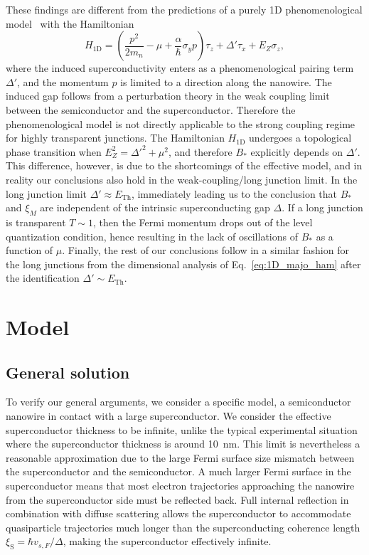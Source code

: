 These findings are different from the predictions of a purely 1D phenomenological model~\cite{Lutchyn2010, Oreg2010} with the Hamiltonian
\begin{equation}
\label{eq:1D_majo_ham}
H_\textrm{1D} = \left(\frac{p^2}{2m_n} -\mu +\frac{\alpha}{\hbar} \sigma_y p\right)\tau_z + \Delta' \tau_x + E_Z \sigma_z,
\end{equation}
where the induced superconductivity enters as a phenomenological pairing term $\Delta'$, and the momentum $p$ is limited to a direction along the nanowire.
The induced gap follows from a perturbation theory in the weak coupling limit between the semiconductor and the superconductor.
Therefore the phenomenological model is not directly applicable to the strong coupling regime for highly transparent junctions.
The Hamiltonian $H_\textrm{1D}$ undergoes a topological phase transition when $E_Z^2 = \Delta'^2 + \mu^2$, and therefore $B_*$ explicitly depends on $\Delta'$.
This difference, however, is due to the shortcomings of the effective model, and in reality our conclusions also hold in the weak-coupling/long junction limit.
In the long junction limit $\Delta'\approx E_\textrm{Th}$, immediately leading us to the conclusion that $B_*$ and $\xi_M$ are independent of the intrinsic superconducting gap $\Delta$.
If a long junction is transparent $T\sim 1$, then the Fermi momentum drops out of the level quantization condition, hence resulting in the lack of oscillations of $B_*$ as a function of $\mu$.
Finally, the rest of our conclusions follow in a similar fashion for the long junctions from the dimensional analysis of Eq.~\eqref{eq:1D_majo_ham} after the identification $\Delta'\sim E_\textrm{Th}$.

\section{Model}
\label{sec:1stmodel}
\subsection{General solution}
\label{sub:gen}
To verify our general arguments, we consider a specific model, a semiconductor nanowire in contact with a large superconductor.
We consider the effective superconductor thickness to be infinite, unlike the typical experimental situation where the superconductor thickness is around \SI{10}{\nm}.
This limit is nevertheless a reasonable approximation due to the large Fermi surface size mismatch between the superconductor and the semiconductor.
A much larger Fermi surface in the superconductor means that most electron trajectories approaching the nanowire from the superconductor side must be reflected back.
Full internal reflection in combination with diffuse scattering allows the superconductor to accommodate quasiparticle trajectories much longer than the superconducting coherence length $\xi_\mathrm S=\hbar v_{s,F}/\Delta$, making the superconductor effectively infinite.

